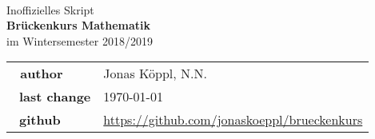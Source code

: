 \documentclass{report}
\theoremstyle{changebreak} %
\numberwithin{theorem}{chapter}
\numberwithin{theorem}{chapter}
\numberwithin{theorem}{chapter}
\numberwithin{theorem}{chapter}
\numberwithin{theorem}{chapter}
\numberwithin{theorem}{chapter}
\begin{document}
\begin{titlepage}
    \ \newline\newline\newline\newline\newline

	\begin{center}

		\huge Inoffizielles Skript \\
		\Huge\textbf{Brückenkurs Mathematik}\\
		\huge im Wintersemester 2018/2019\\ 
		\normalsize

		\vspace{1cm}
		\begin{tabular}[b]{l|l}
			\textbf{\ author}      & Jonas Köppl, N.N. \\\
            \textbf{last change}   & \today \\\
            \textbf{github}        & \url{https://github.com/jonaskoeppl/brueckenkurs}
		\end{tabular}
		\vspace{1cm}

	\end{center}

\end{titlepage}

\tableofcontents 







\end{document}

